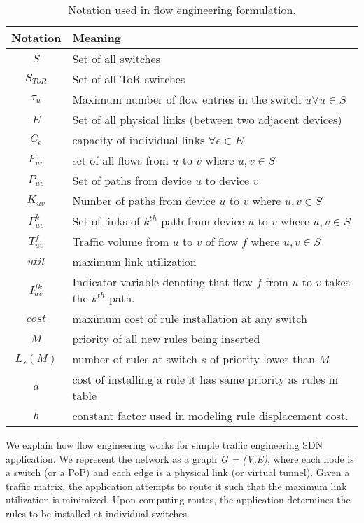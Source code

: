
\begin{table}
\begin{scriptsize}
\begin{tabular}{c|l}
Notation & Meaning \\
\hline
$S$ & Set of all switches
\\$S_{ToR}$ & Set of all ToR switches
\\$\tau_{u}$ & Maximum number of flow entries in the switch $u \forall u \in S$
\\$E$ & Set of all physical links (between two adjacent devices)
\\$C_e$ & capacity of individual links $\forall e \in E$
\\$F_{uv}$ & set of all flows from $u$ to $v$ where $u,v \in S$
\\$P_{uv}$ & Set of paths from device $u$ to device $v$
\\$K _{uv}$ & Number of paths from device $u$ to $v$ where $u,v \in S$ 
\\$P^k _{uv}$ & Set of links of $k^{th}$ path from device $u$ to $v$ where $u,v \in S$
\\$T ^f _{uv}$ & Traffic volume from $u$ to $v$ of flow $f$ where $u,v \in S$
\\$util$ & maximum link utilization
\\$I ^{fk} _{uv}$ & Indicator variable denoting that flow $f$ from $u$ to $v$  takes the $k^{th}$ path.
\\$cost$ & maximum cost of rule installation at any switch
\\$M$ & priority of all new rules being inserted
\\$L_s(M)$ & number of rules at switch $s$ of priority lower than $M$
\\ $a$ & cost of installing a rule it has same priority as rules in table
\\ $b$ & constant factor used in modeling rule displacement cost.
\end{tabular}
\label{tab:notation1}
\caption{Notation used in flow engineering formulation.}
\end{scriptsize}
\end{table}

We explain how flow engineering works for simple traffic engineering SDN
application. We represent
the network as a graph \textit{G
  = (V,E)}, where each node is a switch (or a PoP) and each edge is a physical link (or virtual tunnel). Given a traffic matrix, the application attempts to route it such that the maximum link utilization is minimized. Upon computing routes, the application determines the rules to be installed at individual switches. 

